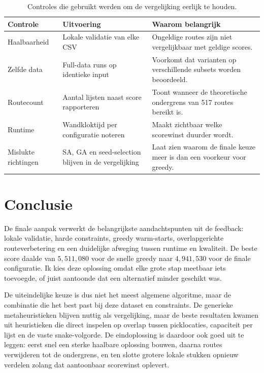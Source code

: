 \documentclass[a4paper,11pt]{article}
\begin{document}
\begin{table}[H]
\centering
\small
\begin{tabular}{p{3.1cm}p{4.2cm}p{6.0cm}}
\toprule
\textbf{Controle} & \textbf{Uitvoering} & \textbf{Waarom belangrijk} \\
\midrule
Haalbaarheid & Lokale validatie van elke CSV & Ongeldige routes zijn niet vergelijkbaar met geldige scores. \\
Zelfde data & Full-data runs op identieke input & Voorkomt dat varianten op verschillende subsets worden beoordeeld. \\
Routecount & Aantal lijsten naast score rapporteren & Toont wanneer de theoretische ondergrens van 517 routes bereikt is. \\
Runtime & Wandkloktijd per configuratie noteren & Maakt zichtbaar welke scorewinst duurder wordt. \\
Mislukte richtingen & SA, GA en seed-selection blijven in de vergelijking & Laat zien waarom de finale keuze meer is dan een voorkeur voor greedy. \\
\bottomrule
\end{tabular}
\caption{Controles die gebruikt werden om de vergelijking eerlijk te houden.}
\label{tab:validation}
\end{table}

\section{Conclusie}
De finale aanpak verwerkt de belangrijkste aandachtspunten uit de feedback: lokale validatie, harde constraints, greedy warm-starts, overlapgerichte routeverbetering en een duidelijke afweging tussen runtime en kwaliteit. De beste score daalde van $5{,}511{,}080$ voor de snelle greedy naar $4{,}941{,}530$ voor de finale configuratie. Ik kies deze oplossing omdat elke grote stap meetbaar iets toevoegde, of juist aantoonde dat een alternatief minder geschikt was.

De uiteindelijke keuze is dus niet het meest algemene algoritme, maar de combinatie die het best past bij deze dataset en constraints. De generieke metaheuristieken blijven nuttig als vergelijking, maar de beste resultaten kwamen uit heuristieken die direct inspelen op overlap tussen picklocaties, capaciteit per lijst en de vaste snake-volgorde. De eindoplossing is daardoor ook goed uit te leggen: eerst snel een sterke haalbare oplossing bouwen, daarna routes verwijderen tot de ondergrens, en ten slotte grotere lokale stukken opnieuw verdelen zolang dat aantoonbaar scorewinst oplevert.
\end{document}
